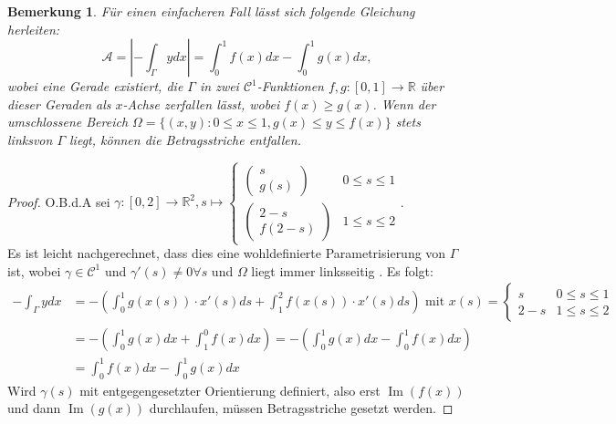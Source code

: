 \documentclass[12pt,a4paper]{article}
\theoremstyle{plain}
\newtheorem{Bemerkung}[Theorem]{Bemerkung}
\newcommand{\R}{\mathbb{R}}
\numberwithin{equation}{section}
\begin{document}
\begin{Bemerkung}
Für einen einfacheren Fall lässt sich folgende Gleichung herleiten: \[
\mathcal{A}=\left|-\int_\Gamma{y dx}\right|=\int_0^1{f(x)dx} - \int_0^1{g(x)dx}, \] wobei eine Gerade existiert, die $\Gamma$ in zwei $\mathcal{C}^1$-Funktionen $f,g: [0,1]\rightarrow \R$ über dieser Geraden als $x$-Achse zerfallen lässt, wobei $f(x)\geq g(x)$. Wenn der umschlossene Bereich $\Omega=\{(x,y):0\leq x\leq 1, g(x)\leq y\leq f(x)\}$ stets \glqq links\grqq von $\Gamma$ liegt, können die Betragsstriche entfallen.
\end{Bemerkung}
\begin{proof}
O.B.d.A sei $\gamma:[0,2] \rightarrow \R^2, s\mapsto \left\lbrace \begin{array}{ll}\left( \begin{array}{c} s \\ g(s) \end{array}\right)& 0\leq s\leq 1\\
\left(\begin{array}{c} 2-s \\ f(2-s)\end{array}\right) & 1\leq s \leq 2 \end{array}\right.$.\\ Es ist leicht nachgerechnet, dass dies eine wohldefinierte Parametrisierung von $\Gamma$ ist, wobei $\gamma\in\mathcal{C}^1$ und $\gamma'(s)\neq 0 \forall s$ und $\Omega$ liegt immer \glqq linksseitig \grqq. Es folgt:
\begin{align*}
-\int_\Gamma {ydx}&=-\left(\int_0^1{g(x(s))\cdot x'(s)ds} + \int_1^2{f(x(s))\cdot x'(s)ds } \right) \text{ mit } x(s)=\left\lbrace\begin{array}{ll} s & 0\leq s\leq 1 \\ 2-s & 1\leq s \leq 2 \end{array}\right.\\
&= -\left(\int_0^1{g(x)dx} + \int_1^0{f(x)dx}\right) = -\left(\int_0^1{g(x)dx} - \int_0^1{f(x)dx}\right)\\
&=\int_0^1{f(x)dx} - \int_0^1{g(x)dx}
\end{align*}
Wird $\gamma(s)$ mit entgegengesetzter Orientierung definiert, also erst $\operatorname{Im}(f(x))$ und dann $\operatorname{Im}(g(x))$ durchlaufen, müssen Betragsstriche gesetzt werden.
\end{proof}
\end{document}
